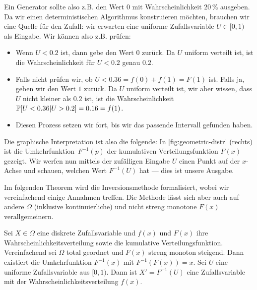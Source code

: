 Ein Generator sollte also z.B. den Wert $0$ mit Wahrscheinlichkeit 20\,\% ausgeben.
Da wir einen deterministischen Algorithmus konstruieren möchten, brauchen wir eine Quelle für den Zufall:
wir erwarten eine uniforme Zufallsvariable $U \in [0, 1)$ als Eingabe.
Wir können also z.B. prüfen:
\begin{itemize}
    \item Wenn $U < 0.2$ ist, dann gebe den Wert $0$ zurück.
          Da $U$ uniform verteilt ist, ist die Wahrscheinlichkeit für $U < 0.2$ genau $0.2$.

    \item Falls nicht prüfen wir, ob $U < 0.36 = f(0) + f(1) = F(1)$ ist. Falls ja, geben wir den Wert $1$ zurück.
          Da $U$ uniform verteilt ist, wir aber wissen, dass $U$ nicht kleiner als $0.2$ ist, ist die Wahrscheinlichkeit $\mathbb{P}\!\left[U < 0.36 | U > 0.2\right] = 0.16 = f(1)$.

    \item Diesen Prozess setzen wir fort, bis wir das passende Intervall gefunden haben.
\end{itemize}

Die graphische Interpretation ist also die folgende:
In \cref{fig:geometric-distr} (rechts) ist die Umkehrfunktion~$F^{-1}(p)$ der kumulativen Verteilungsfunktion $F(x)$ gezeigt.
Wir werfen nun mittels der zufälligen Eingabe $U$ einen Punkt auf der $x$-Achse und schauen, welchen Wert $F^{-1}(U)$ hat --- dies ist unsere Ausgabe.

Im folgenden Theorem wird die Inversionsmethode formalisiert, wobei wir vereinfachend einige Annahmen treffen.
Die Methode lässt sich aber auch auf andere $\Omega$ (inklusive kontinuierliche) und nicht streng monotone $F(x)$ verallgemeinern.

\begin{theorem}
    Sei $X \in \Omega$ eine diskrete Zufallsvariable und $f(x)$ und $F(x)$ ihre Wahrscheinlichkeitsverteilung sowie die kumulative Verteilungsfunktion.
    Vereinfachend sei $\Omega$ total geordnet und $F(x)$ streng monoton steigend.
    Dann existiert die Umkehrfunktion $F^{-1}(x)$ mit $F^{-1}(F(x)) = x$.
    Sei $U$ eine uniforme Zufallsvariable aus $[0, 1)$.
    Dann ist $X' = F^{-1}(U)$ eine Zufallsvariable mit der Wahrscheinlichkeitsverteilung $f(x)$.
\end{theorem}


